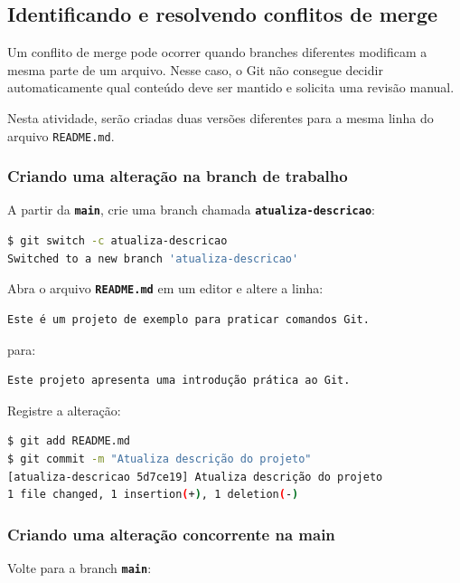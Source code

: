 \documentclass[12pt,a4paper]{article}
\begin{document}
\subsection{Identificando e resolvendo conflitos de merge}

Um conflito de merge pode ocorrer quando branches diferentes modificam a mesma parte de um arquivo. Nesse caso, o Git não consegue decidir automaticamente qual conteúdo deve ser mantido e solicita uma revisão manual. 

Nesta atividade, serão criadas duas versões diferentes para a mesma linha do arquivo \texttt{README.md}.

\subsubsection{Criando uma alteração na branch de trabalho}

A partir da \textbf{\texttt{main}}, crie uma branch chamada \textbf{\texttt{atualiza-descricao}}: 

\begin{lstlisting}[language=bash]
$ git switch -c atualiza-descricao
Switched to a new branch 'atualiza-descricao'
\end{lstlisting}

Abra o arquivo \textbf{\texttt{README.md}} em um editor e altere a linha:

\begin{lstlisting}
Este é um projeto de exemplo para praticar comandos Git.
\end{lstlisting}

para:

\begin{lstlisting}
Este projeto apresenta uma introdução prática ao Git.
\end{lstlisting}

Registre a alteração:

\begin{lstlisting}[language=bash]
$ git add README.md
$ git commit -m "Atualiza descrição do projeto"
[atualiza-descricao 5d7ce19] Atualiza descrição do projeto
1 file changed, 1 insertion(+), 1 deletion(-)
\end{lstlisting}

\subsubsection{Criando uma alteração concorrente na main}

Volte para a branch \textbf{\texttt{main}}:
\end{document}
